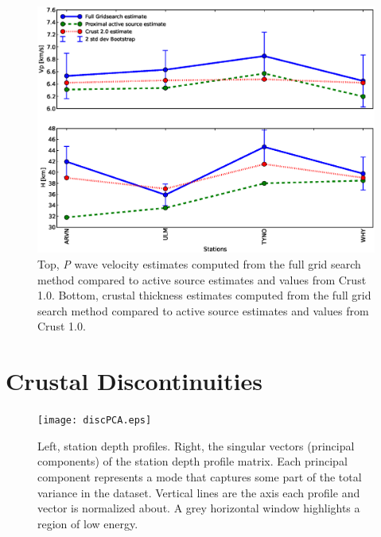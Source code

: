 \documentclass[msc,oneside]{ubcthesis}
\begin{document}
\begin{figure}
  \centering
  \includegraphics[width=\textwidth]{vpactive.eps}
  \caption[Comparison of {\it P} wave velocity estimates]{Top, {\it P} wave velocity estimates computed from the full grid search method compared to active source estimates and values from Crust 1.0. Bottom, crustal thickness estimates computed from the full grid search method compared to active source estimates and values from Crust 1.0.}
  \label{fig:vpactive}
\end{figure}



\section{Crustal Discontinuities} \label{section:discontinuities}

\begin{figure}
  \centering
  \texttt{[image: discPCA.eps]}
  \caption[Station depth profiles and SVD analysis]{Left, station depth profiles. Right, the singular vectors (principal components) of the station depth profile matrix. Each principal component represents a mode that captures some part of the total variance in the dataset. Vertical lines are the axis each profile and vector is normalized about. A grey horizontal window highlights a region of low energy.}
  \label{fig:discPCA}
\end{figure}
\end{document}
